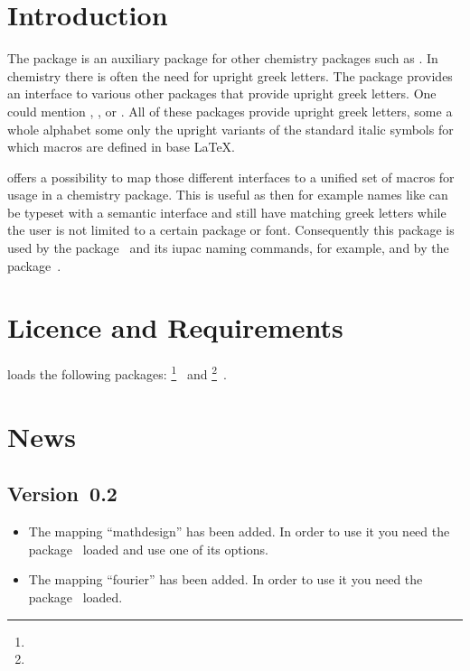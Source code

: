 \documentclass[load-preamble+]{cnltx-doc}
\begin{document}

\listoftables

\section{Introduction}
The \chemgreek{} package is an auxiliary package for other chemistry packages
such as .  In chemistry there is often the need for upright
greek letters.  The \chemgreek{} package provides an interface to various
other packages that provide upright greek letters.  One could mention
, ,  or .  All of these
packages provide upright greek letters, some a whole alphabet some only the
upright variants of the standard italic symbols for which macros are defined
in base \LaTeX.

\chemgreek{} offers a possibility to map those different interfaces to a
unified set of macros for usage in a chemistry package.  This is useful as
then for example names like  can be typeset
with a semantic interface and still have matching greek letters while the user
is not limited to a certain package or font.  Consequently this package is
used by the  package~\cite{pkg:chemmacros} and its \acs{iupac}
naming commands, for example, and by the 
package~\cite{pkg:chemnum}.

\section{Licence and Requirements}
\license

\chemgreek{} loads the following packages:
\footnote{}~\cite{bnd:l3kernel} and
\footnote{}~\cite{bnd:l3packages}.

\section{News}
\subsection{Version~0.2}
\begin{itemize}
  \item The mapping ``mathdesign'' has been added.  In order to use it you
    need the  package~\cite{pkg:mathdesign} loaded and use one
    of its options.
  \item The mapping ``fourier'' has been added.  In order to use it you
    need the  package~\cite{pkg:fourier} loaded.
\end{itemize}
\end{document}
